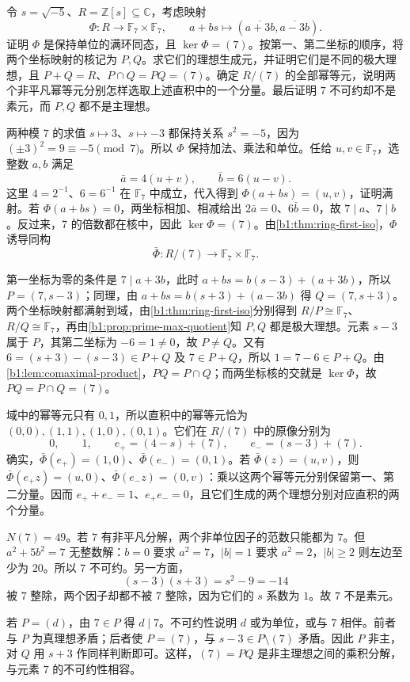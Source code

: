 \begin{exercise}\label{b1:ex:11-ideal-splitting-three}
	令 \(s=\sqrt{-5}\)、\(R=\mathbb Z[s]\subseteq\mathbb C\)，考虑映射
	\[
		\Phi:R\longrightarrow\mathbb F_7\times\mathbb F_7,\qquad a+bs\longmapsto(\overline{a+3b},\overline{a-3b}).
	\]
	证明 \(\Phi\) 是保持单位的满环同态，且 \(\ker\Phi=(7)\)。按第一、第二坐标的顺序，将两个坐标映射的核记为 \(P,Q\)。求它们的理想生成元，并证明它们是不同的极大理想，且 \(P+Q=R\)、\(P\cap Q=PQ=(7)\)。确定 \(R/(7)\) 的全部幂等元，说明两个非平凡幂等元分别怎样选取上述直积中的一个分量。最后证明 \(7\) 不可约却不是素元，而 \(P,Q\) 都不是主理想。
\end{exercise}
\begin{solution}
	两种模 \(7\) 的求值 \(s\mapsto3\)、\(s\mapsto-3\) 都保持关系 \(s^2=-5\)，因为 \((\pm3)^2=9\equiv-5\pmod7\)。所以 \(\Phi\) 保持加法、乘法和单位。任给 \(u,v\in\mathbb F_7\)，选整数 \(a,b\) 满足
	\[
		\bar a=4(u+v),\qquad \bar b=6(u-v).
	\]
	这里 \(4=2^{-1}\)、\(6=6^{-1}\) 在 \(\mathbb F_7\) 中成立，代入得到 \(\Phi(a+bs)=(u,v)\)，证明满射。若 \(\Phi(a+bs)=0\)，两坐标相加、相减给出 \(2\bar a=0\)、\(6\bar b=0\)，故 \(7\mid a\)、\(7\mid b\)。反过来，\(7\) 的倍数都在核中，因此 \(\ker\Phi=(7)\)。由\cref{b1:thm:ring-first-iso}，\(\Phi\) 诱导同构
	\[
		\bar\Phi:R/(7)\longrightarrow\mathbb F_7\times\mathbb F_7.
	\]

	第一坐标为零的条件是 \(7\mid a+3b\)，此时 \(a+bs=b(s-3)+(a+3b)\)，所以 \(P=(7,s-3)\)；同理，由 \(a+bs=b(s+3)+(a-3b)\) 得 \(Q=(7,s+3)\)。两个坐标映射都满射到域，由\cref{b1:thm:ring-first-iso}分别得到 \(R/P\cong\mathbb F_7\)、\(R/Q\cong\mathbb F_7\)，再由\cref{b1:prop:prime-max-quotient}知 \(P,Q\) 都是极大理想。元素 \(s-3\) 属于 \(P\)，其第二坐标为 \(-6=1\ne0\)，故 \(P\ne Q\)。又有 \(6=(s+3)-(s-3)\in P+Q\) 及 \(7\in P+Q\)，所以 \(1=7-6\in P+Q\)。由\cref{b1:lem:comaximal-product}，\(PQ=P\cap Q\)；而两坐标核的交就是 \(\ker\Phi\)，故 \(PQ=P\cap Q=(7)\)。

	域中的幂等元只有 \(0,1\)，所以直积中的幂等元恰为 \((0,0),(1,1),(1,0),(0,1)\)。它们在 \(R/(7)\) 中的原像分别为
	\[
		0,\qquad1,\qquad e_+=(4-s)+(7),\qquad e_-=(s-3)+(7).
	\]
	确实，\(\bar\Phi(e_+)=(1,0)\)、\(\bar\Phi(e_-)=(0,1)\)。若 \(\bar\Phi(z)=(u,v)\)，则 \(\bar\Phi(e_+z)=(u,0)\)、\(\bar\Phi(e_-z)=(0,v)\)：乘以这两个幂等元分别保留第一、第二分量。因而 \(e_++e_-=1\)、\(e_+e_-=0\)，且它们生成的两个理想分别对应直积的两个分量。

	\(N(7)=49\)。若 \(7\) 有非平凡分解，两个非单位因子的范数只能都为 \(7\)。但 \(a^2+5b^2=7\) 无整数解：\(b=0\) 要求 \(a^2=7\)，\(|b|=1\) 要求 \(a^2=2\)，\(|b|\ge2\) 则左边至少为 \(20\)。所以 \(7\) 不可约。另一方面，
	\[
		(s-3)(s+3)=s^2-9=-14
	\]
	被 \(7\) 整除，两个因子却都不被 \(7\) 整除，因为它们的 \(s\) 系数为 \(1\)。故 \(7\) 不是素元。

	若 \(P=(d)\)，由 \(7\in P\) 得 \(d\mid7\)。不可约性说明 \(d\) 或为单位，或与 \(7\) 相伴。前者与 \(P\) 为真理想矛盾；后者使 \(P=(7)\)，与 \(s-3\in P\setminus(7)\) 矛盾。因此 \(P\) 非主，对 \(Q\) 用 \(s+3\) 作同样判断即可。这样，\((7)=PQ\) 是非主理想之间的乘积分解，与元素 \(7\) 的不可约性相容。
\end{solution}
